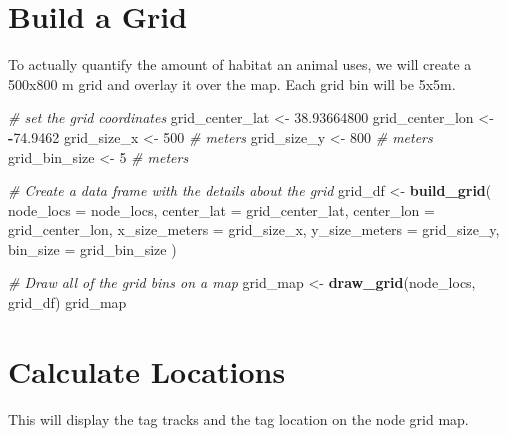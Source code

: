 \documentclass[
]{book}
\newenvironment{Shaded}{\begin{snugshade}}{\end{snugshade}}
\newcommand{\AttributeTok}[1]{\textcolor[rgb]{0.13,0.29,0.53}{#1}}
\newcommand{\CommentTok}[1]{\textcolor[rgb]{0.56,0.35,0.01}{\textit{#1}}}
\newcommand{\DecValTok}[1]{\textcolor[rgb]{0.00,0.00,0.81}{#1}}
\newcommand{\FloatTok}[1]{\textcolor[rgb]{0.00,0.00,0.81}{#1}}
\newcommand{\FunctionTok}[1]{\textcolor[rgb]{0.13,0.29,0.53}{\textbf{#1}}}
\newcommand{\NormalTok}[1]{#1}
\newcommand{\OtherTok}[1]{\textcolor[rgb]{0.56,0.35,0.01}{#1}}
\newcommand{\SpecialCharTok}[1]{\textcolor[rgb]{0.81,0.36,0.00}{\textbf{#1}}}
\begin{document}
\section{Build a Grid}\label{build-a-grid}

To actually quantify the amount of habitat an animal uses, we will create a 500x800 m grid and overlay it over the map. Each grid bin will be 5x5m.

\begin{Shaded}
\begin{Highlighting}[]
\CommentTok{\# set the grid coordinates}
\NormalTok{grid\_center\_lat }\OtherTok{\textless{}{-}} \FloatTok{38.93664800}
\NormalTok{grid\_center\_lon }\OtherTok{\textless{}{-}} \SpecialCharTok{{-}}\FloatTok{74.9462}
\NormalTok{grid\_size\_x }\OtherTok{\textless{}{-}} \DecValTok{500} \CommentTok{\# meters}
\NormalTok{grid\_size\_y }\OtherTok{\textless{}{-}} \DecValTok{800} \CommentTok{\# meters}
\NormalTok{grid\_bin\_size }\OtherTok{\textless{}{-}} \DecValTok{5} \CommentTok{\# meters}

\CommentTok{\# Create a data frame with the details about the grid}
\NormalTok{grid\_df }\OtherTok{\textless{}{-}} \FunctionTok{build\_grid}\NormalTok{(}
  \AttributeTok{node\_locs =}\NormalTok{ node\_locs,}
  \AttributeTok{center\_lat =}\NormalTok{ grid\_center\_lat,}
  \AttributeTok{center\_lon =}\NormalTok{ grid\_center\_lon,}
  \AttributeTok{x\_size\_meters =}\NormalTok{ grid\_size\_x,}
  \AttributeTok{y\_size\_meters =}\NormalTok{ grid\_size\_y,}
  \AttributeTok{bin\_size =}\NormalTok{ grid\_bin\_size}
\NormalTok{)}

\CommentTok{\# Draw all of the grid bins on a map}
\NormalTok{grid\_map }\OtherTok{\textless{}{-}} \FunctionTok{draw\_grid}\NormalTok{(node\_locs, grid\_df)}
\NormalTok{grid\_map}
\end{Highlighting}
\end{Shaded}

\section{Calculate Locations}\label{calculate-locations}

This will display the tag tracks and the tag location on the node grid map.
\end{document}
